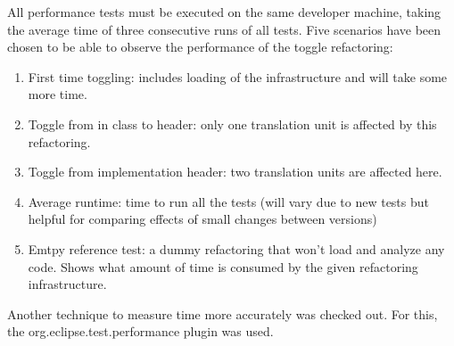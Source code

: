 All performance tests must be executed on the same developer machine, taking the 
average time of three consecutive runs of all tests. Five scenarios have been 
chosen to be able to observe the performance of the toggle refactoring:

\begin{enumerate}
\item First time toggling: includes loading of the infrastructure and will take 
some more time.
\item Toggle from in class to header: only one translation unit is affected by 
this refactoring.
\item Toggle from implementation header: two translation units are affected here.
\item Average runtime: time to run all the tests (will vary due to new tests but 
helpful for comparing effects of small changes between versions)
\item Emtpy reference test: a dummy refactoring that won't load and analyze any 
code. Shows what amount of time is consumed by the given refactoring 
infrastructure.
\end{enumerate}

Another technique to measure time more accurately was checked out. For this, the 
org.eclipse.test.performance plugin was used. 


